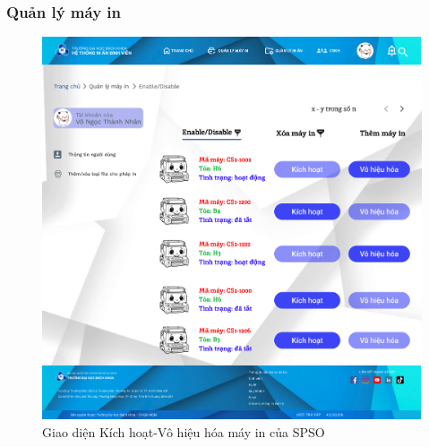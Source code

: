 \subsubsection{Quản lý máy in}
\begin{figure}[H]
    \begin{center}
        \includegraphics[width=1\textwidth]{Images/Figma/Enable-disable.png}
        \caption{Giao diện Kích hoạt-Vô hiệu hóa máy in của SPSO}
        \label{fig:arch}
    \end{center}
\end{figure}
